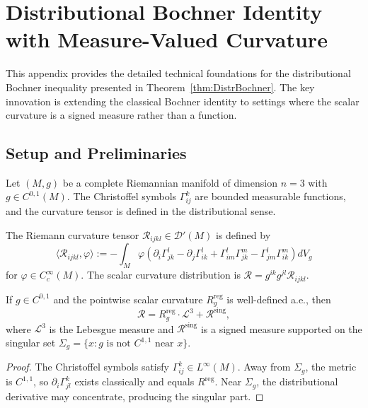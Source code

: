 \section{Distributional Bochner Identity with Measure-Valued Curvature}
\label{app:WeakBochner}

This appendix provides the detailed technical foundations for the distributional Bochner inequality presented in Theorem~\ref{thm:DistrBochner}. The key innovation is extending the classical Bochner identity to settings where the scalar curvature is a signed measure rather than a function.

\subsection{Setup and Preliminaries}
Let $(M, g)$ be a complete Riemannian manifold of dimension $n = 3$ with $g \in C^{0,1}(M)$. The Christoffel symbols $\Gamma^k_{ij}$ are bounded measurable functions, and the curvature tensor is defined in the distributional sense.

\begin{definition}
The Riemann curvature tensor $\mathcal{R}_{ijkl} \in \mathcal{D}'(M)$ is defined by
\begin{equation}
    \langle \mathcal{R}_{ijkl}, \varphi \rangle := -\int_M \varphi \left( \partial_i \Gamma^l_{jk} - \partial_j \Gamma^l_{ik} + \Gamma^l_{im} \Gamma^m_{jk} - \Gamma^l_{jm} \Gamma^m_{ik} \right) dV_g
\end{equation}
for $\varphi \in C^\infty_c(M)$. The scalar curvature distribution is $\mathcal{R} = g^{ik} g^{jl} \mathcal{R}_{ijkl}$.
\end{definition}

\begin{lemma}\label{lem:ScalarDecomp}
If $g \in C^{0,1}$ and the pointwise scalar curvature $R_g^{\text{reg}}$ is well-defined a.e., then
\begin{equation}
    \mathcal{R} = R_g^{\text{reg}} \cdot \mathcal{L}^3 + \mathcal{R}^{\text{sing}},
\end{equation}
where $\mathcal{L}^3$ is the Lebesgue measure and $\mathcal{R}^{\text{sing}}$ is a signed measure supported on the singular set $\Sigma_g = \{x : g \text{ is not } C^{1,1} \text{ near } x\}$.
\end{lemma}

\begin{proof}
The Christoffel symbols satisfy $\Gamma^k_{ij} \in L^\infty(M)$. Away from $\Sigma_g$, the metric is $C^{1,1}$, so $\partial_i \Gamma^k_{jl}$ exists classically and equals $R^{\text{reg}}$. Near $\Sigma_g$, the distributional derivative may concentrate, producing the singular part.
\end{proof}

